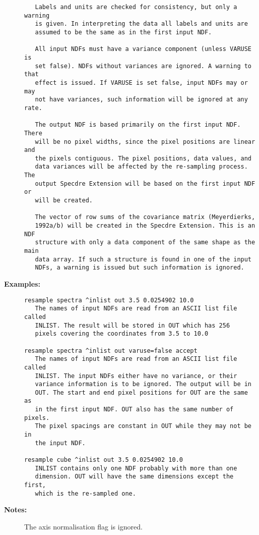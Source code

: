 \begin{description}
\begin{verbatim}
   Labels and units are checked for consistency, but only a warning
   is given. In interpreting the data all labels and units are
   assumed to be the same as in the first input NDF.

   All input NDFs must have a variance component (unless VARUSE is
   set false). NDFs without variances are ignored. A warning to that
   effect is issued. If VARUSE is set false, input NDFs may or may
   not have variances, such information will be ignored at any rate.

   The output NDF is based primarily on the first input NDF. There
   will be no pixel widths, since the pixel positions are linear and
   the pixels contiguous. The pixel positions, data values, and
   data variances will be affected by the re-sampling process. The
   output Specdre Extension will be based on the first input NDF or
   will be created.

   The vector of row sums of the covariance matrix (Meyerdierks,
   1992a/b) will be created in the Specdre Extension. This is an NDF
   structure with only a data component of the same shape as the main
   data array. If such a structure is found in one of the input
   NDFs, a warning is issued but such information is ignored.
\end{verbatim}

\item [{\bf Examples:}]
\begin{verbatim}
resample spectra ^inlist out 3.5 0.0254902 10.0
   The names of input NDFs are read from an ASCII list file called
   INLIST. The result will be stored in OUT which has 256
   pixels covering the coordinates from 3.5 to 10.0

resample spectra ^inlist out varuse=false accept
   The names of input NDFs are read from an ASCII list file called
   INLIST. The input NDFs either have no variance, or their
   variance information is to be ignored. The output will be in
   OUT. The start and end pixel positions for OUT are the same as
   in the first input NDF. OUT also has the same number of pixels.
   The pixel spacings are constant in OUT while they may not be in
   the input NDF.

resample cube ^inlist out 3.5 0.0254902 10.0
   INLIST contains only one NDF probably with more than one
   dimension. OUT will have the same dimensions except the first,
   which is the re-sampled one.
\end{verbatim}

\item [{\bf Notes:}]
The axis normalisation flag is ignored.


\end{description}
